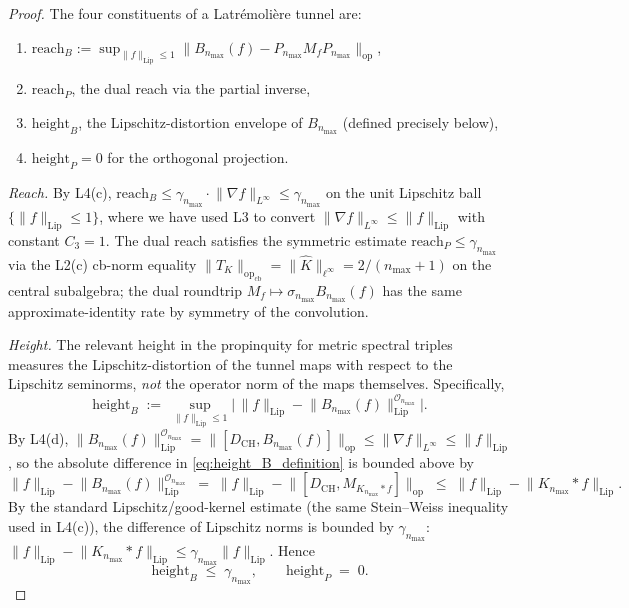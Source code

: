 \documentclass[11pt,a4paper]{article}
\theoremstyle{plain}
\theoremstyle{definition}
\newcommand{\nmax}{n_{\max}}
\newcommand{\Op}{\mathcal{O}}
\newcommand{\opnorm}[1]{\lVert #1 \rVert_{\mathrm{op}}}
\newcommand{\Lipnorm}[1]{\lVert #1 \rVert_{\mathrm{Lip}}}
\newcommand{\norm}[1]{\lVert #1 \rVert}
\newcommand{\Mat}{M}
\newcommand{\DCH}{D_{\mathrm{CH}}}
\newcommand{\KS}{K}
\begin{document}
\begin{proof}
The four constituents of a Latr\'emoli\`ere tunnel are:
\begin{enumerate}\setlength{\itemsep}{2pt}
\item $\mathrm{reach}_B
:= \sup_{\Lipnorm{f} \le 1}
\opnorm{B_{\nmax}(f) - P_{\nmax} \Mat_f P_{\nmax}}$,
\item $\mathrm{reach}_P$, the dual reach via the partial inverse,
\item $\mathrm{height}_B$, the Lipschitz-distortion envelope of
$B_{\nmax}$ (defined precisely below),
\item $\mathrm{height}_P = 0$ for the orthogonal projection.
\end{enumerate}

\emph{Reach.} By L4(c), $\mathrm{reach}_B \le
\gamma_{\nmax}\cdot \norm{\nabla f}_{L^\infty} \le
\gamma_{\nmax}$ on the unit Lipschitz ball
$\{\Lipnorm{f} \le 1\}$, where we have used L3 to convert
$\norm{\nabla f}_{L^\infty} \le \Lipnorm{f}$ with constant $C_3 = 1$.
The dual reach satisfies the symmetric estimate
$\mathrm{reach}_P \le \gamma_{\nmax}$ via the L2(c) cb-norm equality
$\opnorm{T_K}_{\mathrm{cb}} = \norm{\widehat{K}}_{\ell^\infty}
= 2/(\nmax+1)$ on the central subalgebra; the dual roundtrip
$M_f \mapsto \sigma_{\nmax} B_{\nmax}(f)$ has the same approximate-identity
rate by symmetry of the convolution.

\emph{Height.} The relevant height in the propinquity for metric
spectral triples \cite{latremoliere_metric_st_2017} measures the
Lipschitz-distortion of the tunnel maps with respect to the
Lipschitz seminorms, \emph{not} the operator norm of the maps
themselves. Specifically,
\begin{equation}\label{eq:height_B_definition}
   \mathrm{height}_B
   \;:=\; \sup_{\Lipnorm{f} \le 1}
   \bigl|\,\Lipnorm{f} - \Lipnorm{B_{\nmax}(f)}^{\Op_{\nmax}}\bigr|.
\end{equation}
By L4(d), $\Lipnorm{B_{\nmax}(f)}^{\Op_{\nmax}} =
\opnorm{[\DCH, B_{\nmax}(f)]} \le \norm{\nabla f}_{L^\infty}
\le \Lipnorm{f}$, so the absolute difference in
\eqref{eq:height_B_definition} is bounded above by
\begin{equation*}
   \Lipnorm{f} - \Lipnorm{B_{\nmax}(f)}^{\Op_{\nmax}}
   \;=\; \Lipnorm{f} - \opnorm{[\DCH, \Mat_{\KS_{\nmax}*f}]}
   \;\le\; \Lipnorm{f} - \Lipnorm{\KS_{\nmax}*f}.
\end{equation*}
By the standard Lipschitz/good-kernel estimate (the same Stein--Weiss
inequality used in L4(c)), the difference of Lipschitz norms is
bounded by $\gamma_{\nmax}$:\ $\Lipnorm{f} - \Lipnorm{\KS_{\nmax}*f}
\le \gamma_{\nmax}\Lipnorm{f}$. Hence
\begin{equation*}
   \mathrm{height}_B \;\le\; \gamma_{\nmax}, \qquad
   \mathrm{height}_P \;=\; 0.
\end{equation*}


\end{proof}
\end{document}
